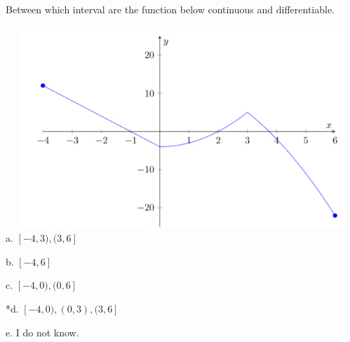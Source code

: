
Between which interval are the function below continuous and differentiable.

\includegraphics[width=5.6in,height=3in]{../../Images/DerivativeQ17.png}\\

a. \( [ -4, 3 ), ( 3, 6 ] \)

b. \( [ -4, 6 ] \)

c. \( [ -4, 0 ), ( 0, 6 ] \)

*d. \( [ -4, 0 ), ( 0, 3 ), ( 3, 6 ] \)

e. I do not know.\\
